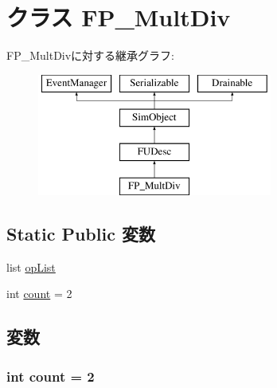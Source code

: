 \hypertarget{classFuncUnitConfig_1_1FP__MultDiv}{
\section{クラス FP\_\-MultDiv}
\label{classFuncUnitConfig_1_1FP__MultDiv}
}
FP\_\-MultDivに対する継承グラフ:\begin{figure}[H]
\begin{center}
\leavevmode
\includegraphics[height=4cm]{classFuncUnitConfig_1_1FP__MultDiv}
\end{center}
\end{figure}
\subsection*{Static Public 変数}
\begin{DoxyCompactItemize}
\item 
list \hyperlink{classFuncUnitConfig_1_1FP__MultDiv_a31b2f9e3ac9a504397b140f513c469cc}{opList}
\item 
int \hyperlink{classFuncUnitConfig_1_1FP__MultDiv_ad43c3812e6d13e0518d9f8b8f463ffcf}{count} = 2
\end{DoxyCompactItemize}


\subsection{変数}
\hypertarget{classFuncUnitConfig_1_1FP__MultDiv_ad43c3812e6d13e0518d9f8b8f463ffcf}{
\subsubsection[{count}]{\setlength{\rightskip}{0pt plus 5cm}int {\bf count} = 2}}
\label{classFuncUnitConfig_1_1FP__MultDiv_ad43c3812e6d13e0518d9f8b8f463ffcf}


